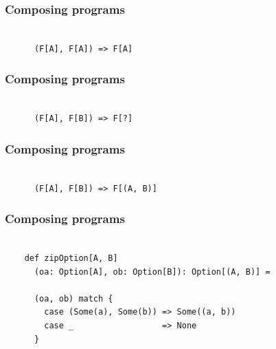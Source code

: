 \documentclass{beamer}
\begin{document}
\begin{frame}[fragile]

  \frametitle{Composing programs}

  \centering
  \Large

  \begin{minipage}{0.70\textwidth}
    \begin{verbatim}

      (F[A], F[A]) => F[A]

    \end{verbatim}
  \end{minipage}

\end{frame}

\begin{frame}[fragile]

  \frametitle{Composing programs}

  \centering
  \Large

  \begin{minipage}{0.70\textwidth}
    \begin{verbatim}

      (F[A], F[B]) => F[?]

    \end{verbatim}
  \end{minipage}

\end{frame}

\begin{frame}[fragile]

  \frametitle{Composing programs}

  \centering
  \Large

  \begin{minipage}{0.8\textwidth}
    \begin{verbatim}

      (F[A], F[B]) => F[(A, B)]

    \end{verbatim}
  \end{minipage}

\end{frame}

\begin{frame}[fragile]

  \frametitle{Composing programs}

  \begin{verbatim}

    def zipOption[A, B]
      (oa: Option[A], ob: Option[B]): Option[(A, B)] =

      (oa, ob) match {
        case (Some(a), Some(b)) => Some((a, b))
        case _                  => None
      }

  \end{verbatim}

\end{frame}
\end{document}
